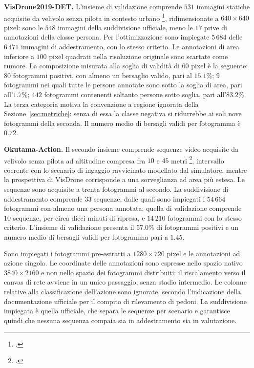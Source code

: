 \ifstampa\documentclass[a4paper,12pt,twoside,openright]{report}\else\documentclass[a4paper,12pt]{report}\fi
\newif\ifrevisione \revisionefalse
\DeclareRobustCommand{\rev}[1]{\ifrevisione{\color{blue!65!black}#1}\else#1\fi}
\begin{document}
\textbf{VisDrone2019-DET.}
\label{sec:visdrone}
L'insieme di validazione comprende $531$ immagini statiche acquisite da velivolo
senza pilota in contesto urbano \footcite{zhu_2021_visdrone}, ridimensionate a
$640 \times 640$ pixel\rev{: sono le $548$ immagini della suddivisione ufficiale,
meno le $17$ prive di annotazioni della classe persona. Per l'ottimizzazione
sono impiegate $5\,684$ delle $6\,471$ immagini di addestramento, con lo stesso
criterio. Le annotazioni di area inferiore a $100$ pixel quadrati nella
risoluzione originale sono scartate come rumore}. La composizione misurata alla soglia di validità di $60$
pixel è la seguente: $80$ fotogrammi positivi, con almeno un bersaglio valido,
pari al $15.1\%$; $9$ fotogrammi \rev{nei quali tutte le persone annotate sono
sotto la soglia di area}, pari
all'$1.7\%$; $442$ fotogrammi contenenti soltanto persone sotto soglia, pari
all'$83.2\%$. La terza categoria motiva la convenzione a regione ignorata della
Sezione~\ref{sec:metriche}: senza di essa la classe negativa si ridurrebbe ai
soli nove fotogrammi della seconda. Il numero medio di bersagli validi per
fotogramma è $0.72$.

\textbf{Okutama-Action.}
\label{sec:okutama}
Il secondo insieme comprende sequenze video acquisite da velivolo senza pilota
ad altitudine compresa fra $10$ e $45$ metri \footcite{barekatain_2017_okutama},
intervallo coerente con lo scenario di ingaggio ravvicinato modellato dal
simulatore, mentre la prospettiva di VisDrone corrisponde a una sorveglianza ad
area più estesa. \rev{Le sequenze sono acquisite a trenta fotogrammi al secondo.
La suddivisione di addestramento comprende $33$ sequenze, dalle quali sono
impiegati i $54\,664$ fotogrammi con almeno una persona annotata; quella di
validazione comprende $10$ sequenze, per circa dieci minuti di ripresa, e
$14\,210$ fotogrammi con lo stesso criterio.} L'insieme di validazione presenta il $57.0\%$ di fotogrammi
positivi e un numero medio di bersagli validi per fotogramma pari a $1.45$.

Sono impiegati i fotogrammi pre-estratti a $1280 \times 720$ pixel e le
annotazioni ad azione singola. Le coordinate delle annotazioni sono espresse
nello spazio nativo $3840 \times 2160$ e non nello spazio dei fotogrammi
distribuiti: il riscalamento verso il canvas di rete avviene in un unico
passaggio, senza stadio intermedio. Le colonne relative alla classificazione
dell'azione sono ignorate, secondo l'indicazione della documentazione ufficiale
per il compito di rilevamento di pedoni. La suddivisione impiegata è quella
ufficiale, che separa le sequenze per scenario e garantisce quindi che nessuna
sequenza compaia sia in \rev{addestramento} sia in valutazione.
\end{document}
